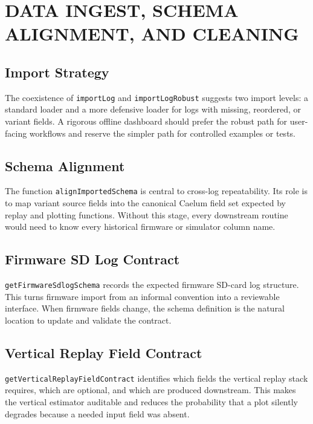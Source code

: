 \documentclass[colorlinks,upint,subscriptcorrection,varvw,hyphenate,balance]{asmeconf}
\newcommand{\code}[1]{\texttt{\allowbreak#1}}
\begin{document}
\section{DATA INGEST, SCHEMA ALIGNMENT, AND CLEANING}

\subsection{Import Strategy}
The coexistence of \code{importLog} and \code{importLogRobust} suggests two import levels: a standard loader and a more defensive loader for logs with missing, reordered, or variant fields. A rigorous offline dashboard should prefer the robust path for user-facing workflows and reserve the simpler path for controlled examples or tests.

\subsection{Schema Alignment}
The function \code{alignImportedSchema} is central to cross-log repeatability. Its role is to map variant source fields into the canonical Caelum field set expected by replay and plotting functions. Without this stage, every downstream routine would need to know every historical firmware or simulator column name.

\subsection{Firmware SD Log Contract}
\code{getFirmwareSdlogSchema} records the expected firmware SD-card log structure. This turns firmware import from an informal convention into a reviewable interface. When firmware fields change, the schema definition is the natural location to update and validate the contract.

\subsection{Vertical Replay Field Contract}
\code{getVerticalReplayFieldContract} identifies which fields the vertical replay stack requires, which are optional, and which are produced downstream. This makes the vertical estimator auditable and reduces the probability that a plot silently degrades because a needed input field was absent.
\end{document}
